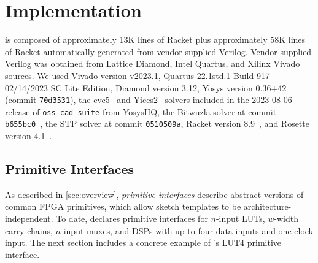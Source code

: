 \section{Implementation}
\label{sec:implementation}


\lr is composed of
  approximately 13K lines of Racket
  plus approximately 58K lines
  of Racket
  automatically generated from 
  vendor-supplied Verilog.
Vendor-supplied Verilog
  was obtained from Lattice Diamond,
  Intel Quartus,
  and Xilinx Vivado
  sources.
We used Vivado version v2023.1,
  Quartus 22.1std.1 Build 917 02/14/2023 SC Lite Edition,
  Diamond version 3.12,
  Yosys version 0.36+42 (commit \texttt{70d3531}),
  the cvc5~\cite{barbosa2022cvc5} and Yices2~\cite{dutertre2006yices,dutertre2014yices}
  solvers
  included in the 2023-08-06 release of \texttt{oss-cad-suite} from YosysHQ,
  the Bitwuzla solver at commit \texttt{b655bc0}~\cite{bitwuzla},
  the STP solver at commit \texttt{0510509a},
  Racket version 8.9~\cite{racket,racket:ref},
  and Rosette version 4.1~\cite{rosette4}.

\subsection{Primitive Interfaces}
\label{sec:impl-primitive-interfaces}

As described in \cref{sec:overview},
\textit{primitive interfaces}
  describe abstract versions
  of common FPGA primitives,
  which allow sketch templates
  to be architecture-independent.
To date, \lr declares primitive interfaces for
  $n$-input LUTs, $w$-width carry chains, 
  $n$-input muxes,
  and DSPs with up to four data inputs and one clock input.
The next section includes a concrete example
  of \lr's LUT4 primitive interface.\tighten



